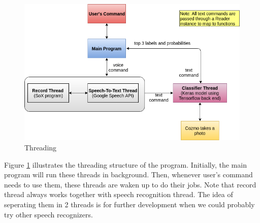 \begin{figure}[!htb]
	\centering
	\includegraphics[width=0.9\hsize]{./figures/threads}
	\caption{Threading}
	\label{fig:threads}
\end{figure}

Figure \ref{fig:threads} illustrates the threading structure of the program. Initially, the main program will run these threads in background. Then, whenever user's command needs to use them, these threads are waken up to do their jobs. Note that record thread always works together with speech recognition thread. The idea of seperating them in 2 threads is for further development when we could probably try other speech recognizers.